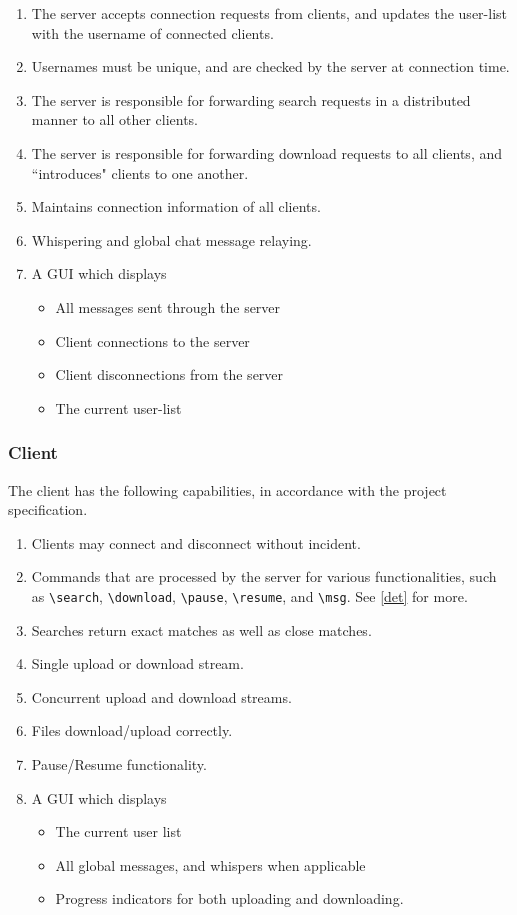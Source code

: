 \documentclass[10pt,a4paper]{article}
\begin{document}
\begin{enumerate}
 \item The server accepts connection requests from clients, and updates the user-list with the username of connected clients.
 \item Usernames must be unique, and are checked by the server at connection time.
 \item The server is responsible for forwarding search requests in a distributed manner to all other clients.
 \item The server is responsible for forwarding download requests to all clients, and ``introduces" clients to one another.
 \item Maintains connection information of all clients.
 \item Whispering and global chat message relaying.
 \item A GUI which displays 
 \begin{itemize}
  \item All messages sent through the server
  \item Client connections to the server
  \item Client disconnections from the server
  \item The current user-list
 \end{itemize}
\end{enumerate}

\subsubsection{Client}
The client has the following capabilities, in accordance with the project specification.

\begin{enumerate}
 \item Clients may connect and disconnect without incident.
 \item Commands that are processed by the server for various functionalities, such as \verb|\search|, \verb|\download|, \verb|\pause|, \verb|\resume|, and \verb|\msg|. See \ref{det} for more.
 \item Searches return exact matches as well as close matches.
 \item Single upload or download stream.
 \item Concurrent upload and download streams.
 \item Files download/upload correctly.
 \item Pause/Resume functionality.
 \item A GUI which displays
 \begin{itemize}
  \item The current user list
  \item All global messages, and whispers when applicable
  \item Progress indicators for both uploading and downloading.
 \end{itemize}

\end{enumerate}
\end{document}
